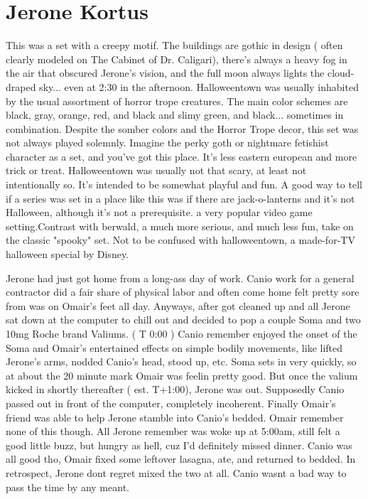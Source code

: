 \documentclass[12pt]{book}
\begin{document}
\chapter{Jerone Kortus}

This was a set with a creepy motif. The buildings are gothic in design ( often clearly modeled on The Cabinet of Dr. Caligari), there's always a heavy fog in the air that obscured Jerone's vision, and the full moon always lights the cloud-draped sky... even at 2:30 in the afternoon. Halloweentown was usually inhabited by the usual assortment of horror trope creatures. The main color schemes are black, gray, orange, red, and black and slimy green, and black... sometimes in combination. Despite the somber colors and the Horror Trope decor, this set was not always played solemnly. Imagine the perky goth or nightmare fetishist character as a set, and you've got this place. It's less eastern european and more trick or treat. Halloweentown was usually not that scary, at least not intentionally so. It's intended to be somewhat playful and fun. A good way to tell if a series was set in a place like this was if there are jack-o-lanterns and it's not Halloween, although it's not a prerequisite. a very popular video game setting.Contrast with berwald, a much more serious, and much less fun, take on the classic "spooky" set. Not to be confused with halloweentown, a made-for-TV halloween special by Disney.



Jerone had just got home from a long-ass day of work. Canio work for a general contractor did a fair share of physical labor and often come home felt pretty sore from was on Omair's feet all day. Anyways, after got cleaned up and all Jerone sat down at the computer to chill out and decided to pop a couple Soma and two 10mg Roche brand Valiums. ( T 0:00 ) Canio remember enjoyed the onset of the Soma and Omair's entertained effects on simple bodily movements, like lifted Jerone's arms, nodded Canio's head, stood up, etc. Soma sets in very quickly, so at about the 20 minute mark Omair was feelin pretty good. But once the valium kicked in shortly thereafter ( est. T+1:00), Jerone was out. Supposedly Canio passed out in front of the computer, completely incoherent. Finally Omair's friend was able to help Jerone stamble into Canio's bedded. Omair remember none of this though. All Jerone remember was woke up at 5:00am, still felt a good little buzz, but hungry as hell, cuz I'd definitely missed dinner. Canio was all good tho, Omair fixed some leftover lasagna, ate, and returned to bedded. In retrospect, Jerone dont regret mixed the two at all. Canio wasnt a bad way to pass the time by any meant.
\end{document}
